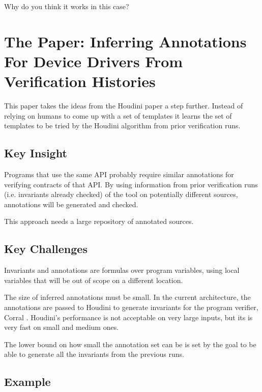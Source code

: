 \documentclass[12pt]{article}
\begin{document}
Why do you think it works in this case?

\section{The Paper: Inferring Annotations For Device Drivers From Verification Histories}

This paper takes the ideas from the Houdini \cite{houdini} paper a step further. Instead of relying on humans to come up with a set of templates it learns the set of templates to be tried by the Houdini algorithm from prior verification runs.

\subsection{Key Insight}
Programs that use the same API probably require similar annotations for verifying contracts of that API.  
By using information from prior verification runs (i.e. invariants already checked) of the tool on potentially different sources, annotations will be generated and checked. 

This approach needs a large repository of annotated sources. 

\subsection{Key Challenges}
Invariants and annotations are formulas over program variables, using local variables that will be out of scope on a different location.

The size of inferred annotations must be small. In the current architecture, the annotations are passed to Houdini \cite{houdini} to generate invariants for the program verifier, Corral \cite{Corral}. Houdini's performance is not acceptable on very large inputs, but its is very fast on small and medium ones.

The lower bound on how small the annotation set can be is set by the goal to be able to generate all the invariants from the previous runs.

\subsection{Example}
\end{document}
